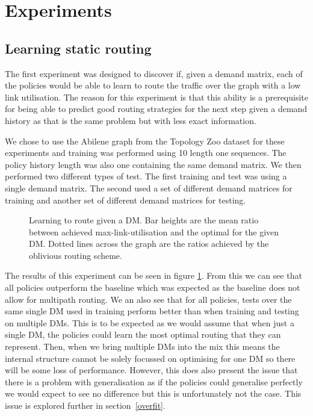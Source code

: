 \section{Experiments}

\subsection{Learning static routing}
\label{section:exp_static}
The first experiment was designed to discover if, given a demand matrix, each of the policies would be able to learn to route the traffic over the graph with a low link utilisation. The reason for this experiment is that this ability is a prerequisite for being able to predict good routing strategies for the next step given a demand history as that is the same problem but with less exact information.

We chose to use the Abilene graph from the Topology Zoo dataset for these experiments and training was performed using 10 length one sequences. The policy history length was also one containing the same demand matrix. We then performed two different types of test. The first training and test was using a single demand matrix. The second used a set of different demand matrices for training and another set of different demand matrices for testing.

\begin{figure}
    \centering
    
    \caption{Learning to route given a DM. Bar heights are the mean ratio between achieved max-link-utilisation and the optimal for the given DM. Dotted lines across the graph are the ratios achieved by the oblivious routing scheme.}
    \label{fig:exp_static}
\end{figure}

The results of this experiment can be seen in figure \ref{fig:exp_static}. From this we can see that all policies outperform the baseline which was expected as the baseline does not allow for multipath routing. We an also see that for all policies, tests over the same single DM used in training perform better than when training and testing on multiple DMs. This is to be expected as we would assume that when just a single DM, the policies could learn the most optimal routing that they can represent. Then, when we bring multiple DMs into the mix this means the internal structure cannot be solely focussed on optimising for one DM so there will be some loss of performance. However, this does also present the issue that there is a problem with generalisation as if the policies could generalise perfectly we would expect to see no difference but this is unfortunately not the case. This issue is explored further in section~\ref{overfit}.


